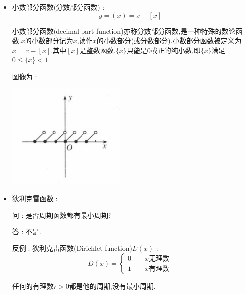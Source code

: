 {{{{\begin{itemize}
{              下取整函数的符号用方括号$[x]$表示,称作高斯符号.
              }
        \item {
              小数部分函数(分数部分函数) : $$
                  y = (x) = x - [x]
              $$

              小数部分函数(decimal part function)亦称分数部分函数,是一种特殊的数论函数.$x$的小数部分记为${x}$,读作$x$的小数部分(或分数部分).小数部分函数被定义为${x}=x-[x]$,其中$[x]$是整数函数.$\{x\}$只能是0或正的纯小数,即$\{x\}$满足$0≤\{x\}<1$


              图像为 :

              \begin{center}
                  \includegraphics[]{resources/DecimalPartFunction.png}
              \end{center}
              }
        \item {
              狄利克雷函数 :

              问 : 是否周期函数都有最小周期?

              答 : 不是.

              反例 : 狄利克雷函数(Dirichlet function)$D(x)$ : $$
                  D(x)
                  =
                  \begin{cases}
                      0\qquad \mbox{$x$无理数} \\
                      1\qquad \mbox{$x$有理数}
                  \end{cases}
              $$


              任何的有理数$r > 0$都是他的周期,没有最小周期.
              }
    \end{itemize}
}%

}%

}%

}

